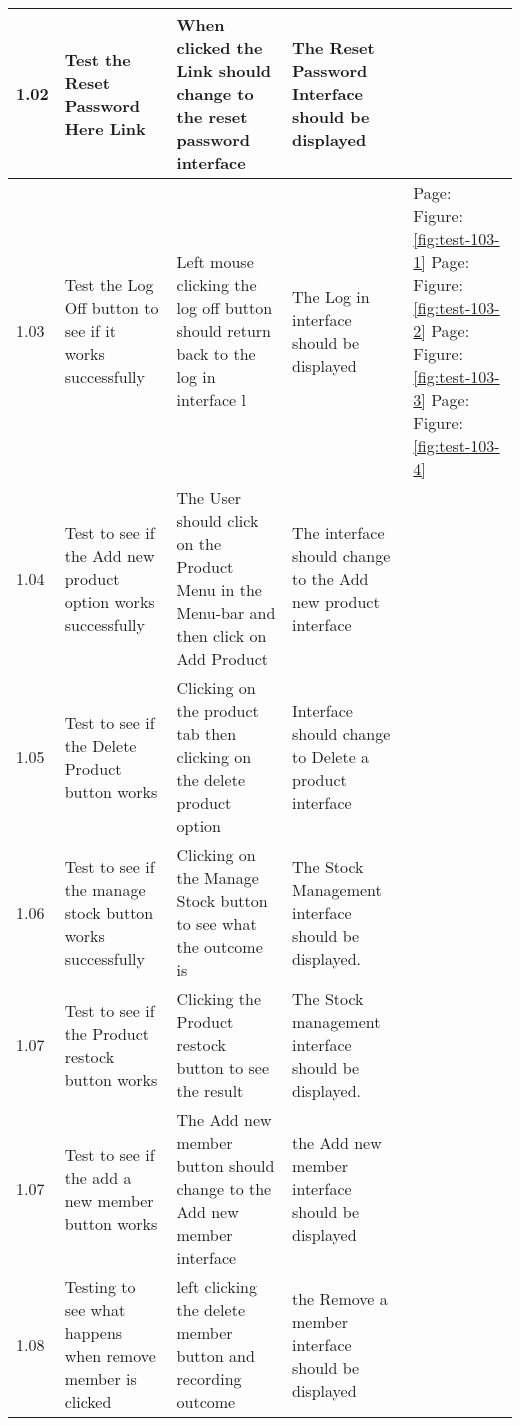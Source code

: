 \begin{flushleft}
\begin{longtable}{|p{1cm}|p{2.5cm}|p{2.5cm}|p{2cm}|p{2cm}|}
	1.02 & Test the Reset Password Here Link & When clicked the Link should change to the reset password interface  & The Reset Password Interface should be displayed &  \\ \hline
	1.03 & Test the Log Off button to see if it works successfully & Left mouse clicking the log off button should return back to the log in interface l & The Log in interface should be displayed & Page: \pageref{fig:test-103-1} \newline Figure: \ref{fig:test-103-1} \newline \newline Page: \pageref{fig:test-103-2} \newline Figure: \ref{fig:test-103-2}  \newline \newline Page: \pageref{fig:test-103-3} \newline Figure: \ref{fig:test-103-3}  \newline \newline Page: \pageref{fig:test-103-4} \newline Figure: \ref{fig:test-103-4} \\ \hline
	1.04 & Test to see if the Add new product option works successfully & The User should click on the Product Menu in the Menu-bar and then click on Add Product &  The interface should change to the Add new product interface& \\ \hline
	1.05 & Test to see if the Delete Product button works & Clicking on the product tab then clicking on the delete product option & Interface should change to Delete a product interface&  \\ \hline
	1.06 & Test to see if the manage stock button works successfully & Clicking on the Manage Stock button to see what the outcome is & The Stock Management interface should be displayed. &  \\ \hline
	\rowcolor{dark-grey}1.07 & Test to see if the Product restock button works & Clicking the Product restock button to see the result & The Stock management interface should be displayed. & \\ \hline
	1.07 & Test to see if the add a new member button works & The Add new member button should change to the Add new member interface & the Add new member interface should be displayed& \\ \hline
	1.08 & Testing to see what happens when remove member is clicked & left clicking the delete member button and recording outcome & the Remove a member interface should be displayed & \\ \hline

\end{longtable}
\end{flushleft}
